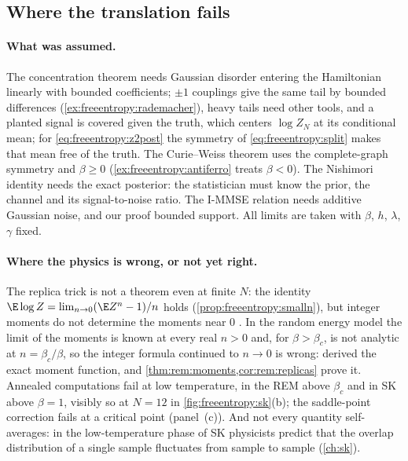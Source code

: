 \begin{refsection}
\section{Where the translation fails}\label{sec:freeentropy:fails}

\paragraph{What was assumed.} The concentration theorem needs Gaussian disorder entering the Hamiltonian linearly with bounded coefficients; $\pm1$ couplings give the same tail by bounded differences (\cref{ex:freeentropy:rademacher}), heavy tails need other tools, and a planted signal is covered given the truth, which centers $\log Z_N$ at its conditional mean; for \eqref{eq:freeentropy:z2post} the symmetry of \eqref{eq:freeentropy:split} makes that mean free of the truth. The Curie--Weiss theorem uses the complete-graph symmetry and $\beta\ge0$ (\cref{ex:freeentropy:antiferro} treats $\beta<0$). The Nishimori identity needs the exact posterior: the statistician must know the prior, the channel and its signal-to-noise ratio. The I-MMSE relation needs additive Gaussian noise, and our proof bounded support. All limits are taken with $\beta$, $h$, $\lambda$, $\gamma$ fixed.

\paragraph{Where the physics is wrong, or not yet right.} The replica trick is not a theorem even at finite $N$: the identity $\E\log Z=\lim_{n\to0}(\E Z^n-1)/n$ holds (\cref{prop:freeentropy:smalln}), but integer moments do not determine the moments near $0$ \parencite{Tanaka2007}. In the random energy model the limit of the moments is known at every real $n>0$ and, for $\beta>\beta_c$, is not analytic at $n=\beta_c/\beta$, so the integer formula continued to $n\to0$ is wrong: \textcite{OgureKabashima2009a} derived the exact moment function, and \cref{thm:rem:moments,cor:rem:replicas} prove it. Annealed computations fail at low temperature, in the REM above $\beta_c$ and in SK above $\beta=1$, visibly so at $N=12$ in \cref{fig:freeentropy:sk}(b); the saddle-point correction fails at a critical point (panel~(c)). And not every quantity self-averages: in the low-temperature phase of SK physicists predict that the overlap distribution of a single sample fluctuates from sample to sample \parencite{MezardParisiVirasoro1987} (\cref{ch:sk}).


\end{refsection}

